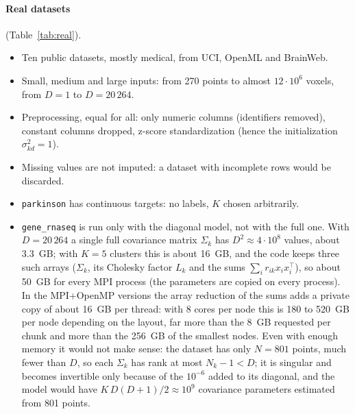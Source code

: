 \documentclass[conference,onecolumn]{IEEEtran}
\begin{document}
\paragraph{Real datasets} (Table~\ref{tab:real}).
\begin{itemize}
\item Ten public datasets, mostly medical, from UCI, OpenML and BrainWeb.
\item Small, medium and large inputs: from 270 points to almost $12\cdot10^6$ voxels, from $D=1$ to $D=20\,264$.
\item Preprocessing, equal for all: only numeric columns (identifiers removed), constant columns dropped, z-score standardization (hence the initialization $\sigma^2_{kd}=1$).
\item Missing values are not imputed: a dataset with incomplete rows would be discarded.
\item \texttt{parkinson} has continuous targets: no labels, $K$ chosen arbitrarily.
\item \texttt{gene\_rnaseq} is run only with the diagonal model, not with the full one. With $D=20\,264$ a single full covariance matrix $\Sigma_k$ has $D^2\approx4\cdot10^8$ values, about 3.3~GB; with $K=5$ clusters this is about 16~GB, and the code keeps three such arrays ($\Sigma_k$, its Cholesky factor $L_k$ and the sums $\sum_i r_{ik}x_ix_i^\top$), so about 50~GB for every MPI process (the parameters are copied on every process). In the MPI+OpenMP versions the array reduction of the sums adds a private copy of about 16~GB per thread: with 8 cores per node this is 180 to 520~GB per node depending on the layout, far more than the 8~GB requested per chunk and more than the 256~GB of the smallest nodes. Even with enough memory it would not make sense: the dataset has only $N=801$ points, much fewer than $D$, so each $\Sigma_k$ has rank at most $N_k-1<D$; it is singular and becomes invertible only because of the $10^{-6}$ added to its diagonal, and the model would have $K\,D(D+1)/2\approx10^9$ covariance parameters estimated from 801 points.
\end{itemize}
\end{document}
